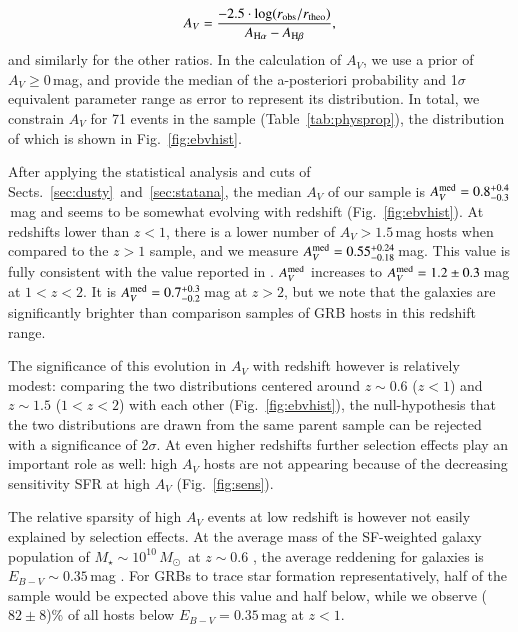 \documentclass[traditabstract, longauth]{aa}
\newcommand{\Msun}{$M_\odot$}
\begin{document}
\begin{equation}
A_V = \frac{-2.5\cdot\log({r_{\rm{obs}}}/{r_{\rm{theo}}})} {A_{{\rm{H}\alpha}}-A_{{\rm{H}\beta}}},
\end{equation}
and similarly for the other ratios. In the calculation of $A_V$, we use a prior of $A_V \geq 0$\,mag, and provide the median of the a-posteriori probability and 1$\sigma$ equivalent parameter range as error to represent its distribution. In total, we constrain $A_V$ for 71 events in the sample (Table~\ref{tab:physprop}), the distribution of which is shown in Fig.~\ref{fig:ebvhist}. 

 {After applying the statistical analysis and cuts of Sects.~\ref{sec:dusty}~and~\ref{sec:statana}, the median $A_V$ of our sample is $A_V^{\rm med}=0.8^{+0.4}_{-0.3}$\,mag} and seems to be somewhat evolving with redshift (Fig.~\ref{fig:ebvhist}). At redshifts lower than $z<1$, there is a lower number of $A_V>1.5$\,mag hosts when compared to the $z>1$ sample, and we measure $A_V^{\rm{med}}=0.55_{-0.18}^{+0.24}$\,mag. This value is fully consistent with the value reported in \citet{2009ApJ...691..182S}. $A_V^{\rm{med}}$ increases to $A_V^{\rm{med}}=1.2\pm0.3$\,mag at $1<z<2$. It is $A_V^{\rm{med}}=0.7_{-0.2}^{+0.3}$\,mag at $z > 2$, but we note that the galaxies are significantly brighter than comparison samples of GRB hosts in this redshift range.

The significance of this evolution in $A_V$ with redshift however is relatively modest: comparing the two distributions centered around $z\sim0.6$ ($z<1$) and $z\sim1.5$ ($1<z<2$) with each other (Fig.~\ref{fig:ebvhist}), the null-hypothesis that the two distributions are drawn from the same parent sample can be rejected with a significance of 2$\sigma$. At even higher redshifts further selection effects play an important role as well: high $A_V$ hosts are not appearing because of the decreasing sensitivity SFR at high $A_V$ (Fig.~\ref{fig:sens}). 

{The relative sparsity of high $A_V$ events at low redshift is however not easily explained by selection effects. At the average mass of the SF-weighted galaxy population of $M_{\star}\sim10^{10}$\,\Msun\, at $z\sim0.6$ \citep{2013ApJ...778..128P, 2014A&A...565A.112H}, the average reddening for galaxies is $E_{B-V}\sim0.35$\,{mag} \citep[][and references therein]{2014ApJ...792...75Z}. For GRBs to trace star formation representatively, half of the sample would be expected above this value and half below, while we observe ($82\pm8$)\% of all hosts below $E_{B-V}=0.35$\,{mag} at $z<1$.}
\end{document}
